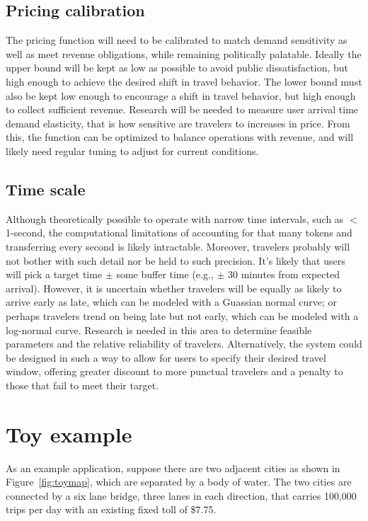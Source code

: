 \documentclass{article}
\begin{document}
\subsection{Pricing calibration}
The pricing function will need to be calibrated to match demand sensitivity as well as meet revenue obligations, while remaining politically palatable. Ideally the upper bound will be kept as low as possible to avoid public dissatisfaction, but high enough to achieve the desired shift in travel behavior. The lower bound must also be kept low enough to encourage a shift in travel behavior, but high enough to collect sufficient revenue. Research will be needed to measure user arrival time demand elasticity, that is how sensitive are travelers to increases in price. From this, the function can be optimized to balance operations with revenue, and will likely need regular tuning to adjust for current conditions. 

\subsection{Time scale}
Although theoretically possible to operate with narrow time intervals, such as $<$1-second, the computational limitations of accounting for that many tokens and transferring every second is likely intractable. Moreover, travelers probably will not bother with such detail nor be held to such precision. It's likely that users will pick a target time $\pm$ some buffer time (e.g., $\pm$ 30 minutes from expected arrival). However, it is uncertain whether travelers will be equally as likely to arrive early as late, which can be modeled with a Guassian normal curve; or perhaps travelers trend on being late but not early, which can be modeled with a log-normal curve. Research is needed in this area to determine feasible parameters and the relative reliability of travelers. Alternatively, the system could be designed in such a way to allow for users to specify their desired travel window, offering greater discount to more punctual travelers and a penalty to those that fail to meet their target.

\section{Toy example}
 As an example application, suppose there are two adjacent cities as shown in Figure~\ref{fig:toymap}, which are separated by a body of water. The two cities are connected by a six lane bridge, three lanes in each direction, that carries 100,000 trips per day with an existing fixed toll of \$7.75.
 
\end{document}
